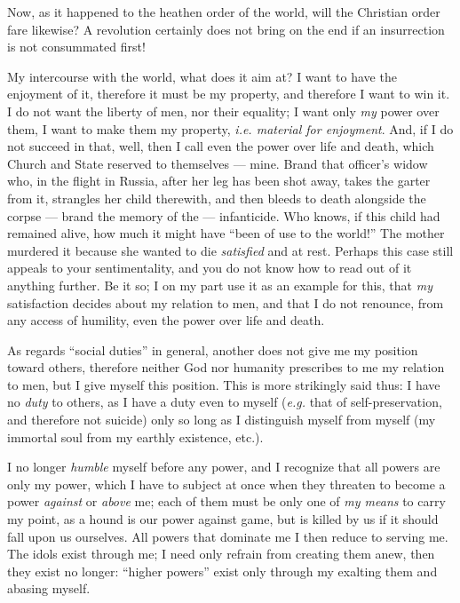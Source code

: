 Now, as it happened to the heathen order of the world, will the Christian 
order fare likewise? A revolution certainly does not bring on the end if an 
insurrection is not consummated first!

My intercourse with the world, what does it aim at? I want to have the 
enjoyment of it, therefore it must be my property, and therefore I want to win 
it. I do not want the liberty of men, nor their equality; I want only 
\textit{my} power over them, I want to make them my property, \textit{i.e. 
material for enjoyment}. And, if I do not succeed in that, well, then I call 
even the power over life and death, which Church and State reserved to 
themselves --- mine. Brand that officer's widow who, in the flight in Russia, 
after her leg has been shot away, takes the garter from it, strangles her 
child therewith, and then bleeds to death alongside the corpse --- brand the 
memory of the --- infanticide. Who knows, if this child had remained alive, how 
much it might have ``been of use to the world!'' The mother murdered it 
because she wanted to die \textit{satisfied} and at rest. Perhaps this case 
still appeals to your sentimentality, and you do not know how to read out of 
it anything further. Be it so; I on my part use it as an example for this, 
that \textit{my} satisfaction decides about my relation to men, and that I do 
not renounce, from any access of humility, even the power over life and death.

As regards ``social duties'' in general, another does not give me my 
position toward others, therefore neither God nor humanity prescribes to me my 
relation to men, but I give myself this position. This is more strikingly said 
thus: I have no \textit{duty} to others, as I have a duty even to myself 
(\textit{e.g.} that of self-preservation, and therefore not suicide) only so 
long as I distinguish myself from myself (my immortal soul from my earthly 
existence, etc.).

I no longer \textit{humble} myself before any power, and I recognize that all 
powers are only my power, which I have to subject at once when they threaten 
to become a power \textit{against} or \textit{above} me; each of them must be 
only one of \textit{my means} to carry my point, as a hound is our power 
against game, but is killed by us if it should fall upon us ourselves. All 
powers that dominate me I then reduce to serving me. The idols exist through 
me; I need only refrain from creating them anew, then they exist no longer: 
``higher powers'' exist only through my exalting them and abasing myself.

